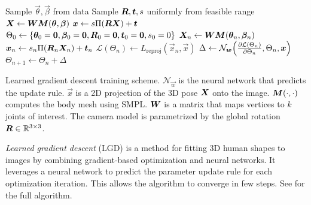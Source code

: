 \begin{algorithm}[t]
    \begin{algorithmic}[1]
        \State Sample $\vec{\theta}, \vec{\beta}$ from data
        \State Sample $\bm{R}, \bm{t}, s$ uniformly from feasible range
        \State $\bm{X} \gets \bm{W} \bm{M}(\bm{\theta}, \bm{\beta})$
        \State $\bm{x} \gets s \Pi(\bm{R} \bm{X}) + \bm{t}$
        \State $\Theta_0 \gets \{ \bm{\theta}_0 = \bm{0}, \bm{\beta}_0 = \bm{0}, \bm{R}_0 = \bm{0}, \bm{t}_0 = \bm{0}, s_0 = 0 \}$
        \State $\bm{X}_n \gets \bm{W} \bm{M}(\bm{\theta}_n, \bm{\beta}_n)$
        \State $\bm{x}_n \gets s_n \Pi(\bm{R}_n \bm{X}_n) + \bm{t}_n$
        \State $\mathcal{L}(\Theta_n) \gets L_{\mathrm{reproj}}(\vec{x}_n, \vec{x})$
        \State $\Delta \gets \mathcal{N}_{\vec{w}} \lft( \pdv{\mathcal{L}(\Theta_n)}{\Theta_n}, \Theta_n, \vec{x} \rgt)$
        \State $\Theta_{n+1} \gets \Theta_n + \Delta$
        \EndFor
    \end{algorithmic}
    \caption{Learned gradient descent training scheme. $\mathcal{N}_{\vec{w}}$ is the neural network that predicts the update rule. $\vec{x}$ is a 2D projection of the 3D pose $\bm{X}$ onto the image. $\bm{M}(\cdot, \cdot)$ computes the body mesh using SMPL. $\bm{W}$ is a matrix that maps vertices to $k$ joints of interest. The camera model is parametrized by the global rotation $\bm{R} \in \mathbb{R}^{3\times 3}$.}
    \label{alg:lgd}
\end{algorithm}

\textit{Learned gradient descent} (LGD) \citep{song2020human} is a method for fitting 3D human shapes
to images by combining gradient-based optimization and neural networks. It leverages a neural network
to predict the parameter update rule for each optimization iteration. This allows the algorithm to
converge in few steps. See  for the full algorithm.

